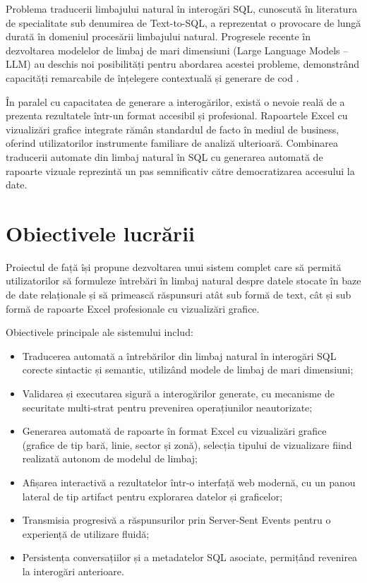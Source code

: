 \documentclass[12pt, a4paper]{report}
\begin{document}
Problema traducerii limbajului natural în interogări SQL, cunoscută în literatura de specialitate sub denumirea de Text-to-SQL, a reprezentat o provocare de lungă durată în domeniul procesării limbajului natural. Progresele recente în dezvoltarea modelelor de limbaj de mari dimensiuni (Large Language Models -- LLM) au deschis noi posibilități pentru abordarea acestei probleme, demonstrând capacități remarcabile de înțelegere contextuală și generare de cod \cite{gpt4}.

În paralel cu capacitatea de generare a interogărilor, există o nevoie reală de a prezenta rezultatele într-un format accesibil și profesional. Rapoartele Excel cu vizualizări grafice integrate rămân standardul de facto în mediul de business, oferind utilizatorilor instrumente familiare de analiză ulterioară. Combinarea traducerii automate din limbaj natural în SQL cu generarea automată de rapoarte vizuale reprezintă un pas semnificativ către democratizarea accesului la date.

\section{Obiectivele lucrării}

Proiectul de față își propune dezvoltarea unui sistem complet care să permită utilizatorilor să formuleze întrebări în limbaj natural despre datele stocate în baze de date relaționale și să primească răspunsuri atât sub formă de text, cât și sub formă de rapoarte Excel profesionale cu vizualizări grafice.

Obiectivele principale ale sistemului includ:

\begin{itemize}[nosep]
  \item Traducerea automată a întrebărilor din limbaj natural în interogări SQL corecte sintactic și semantic, utilizând modele de limbaj de mari dimensiuni;
  \item Validarea și executarea sigură a interogărilor generate, cu mecanisme de securitate multi-strat pentru prevenirea operațiunilor neautorizate;
  \item Generarea automată de rapoarte în format Excel cu vizualizări grafice (grafice de tip bară, linie, sector și zonă), selecția tipului de vizualizare fiind realizată autonom de modelul de limbaj;
  \item Afișarea interactivă a rezultatelor într-o interfață web modernă, cu un panou lateral de tip artifact pentru explorarea datelor și graficelor;
  \item Transmisia progresivă a răspunsurilor prin Server-Sent Events pentru o experiență de utilizare fluidă;
  \item Persistența conversațiilor și a metadatelor SQL asociate, permițând revenirea la interogări anterioare.
\end{itemize}
\end{document}
